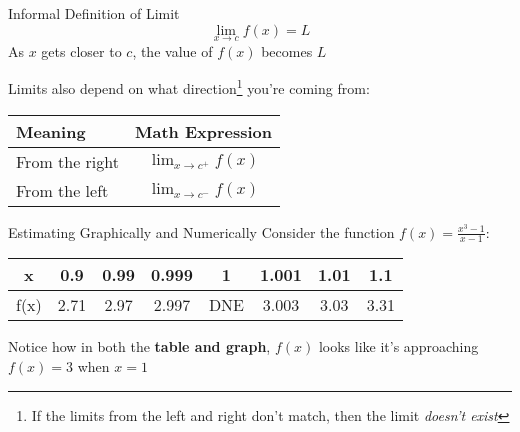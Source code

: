 \documentclass{MathNotes}
\begin{document}
\begin{multicols}{2}[]
\begin{theorem}{Informal Definition of Limit}
    \[\lim_{x\to c}f(x)=L\] 
    As $x$ gets closer to $c$, the value of $f(x)$ becomes $L$
\end{theorem}


Limits also depend on what direction\footnote{If the limits from the left and
right don't match, then the limit \textit{doesn't exist}} you're coming from:
\begin{tabular}{ |l|c| }
    \hline
    Meaning & Math Expression\\
    \hline
    \hline
    From the right & $\lim_{x\to c^+}f(x)$ \\
    \hline
    From the left & $\lim_{x\to c^-}f(x)$ \\
    \hline
\end{tabular}
\end{multicols}

\begin{example}{Estimating Graphically and Numerically}\label{ex:1.2}
    Consider the function $f(x)=\frac{x^3-1}{x-1}$:
    \begin{center}

        \begin{tabular}{ |c||c|c|c|c|c|c|c| }
            \hline
            x    & 0.9 & 0.99 & 0.999 & 1 & 1.001 & 1.01 & 1.1\\
            \hline
            f(x) & 2.71 & 2.97 & 2.997 &DNE& 3.003 & 3.03 & 3.31 \\
            \hline
        \end{tabular}
    \end{center}

    Notice how in both the \textbf{table and graph}, $f(x)$ looks like it's
    approaching $f(x)=3$ when $x=1$
\end{example}
\end{document}
